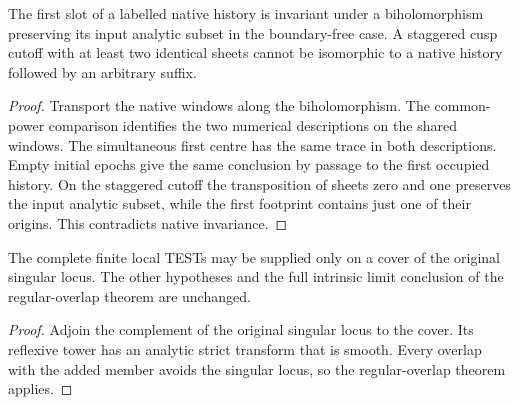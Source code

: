 \begin{proposition}
\label{hir:g8-native-cusp-schedule-symmetry}
\leanok
The first slot of a labelled native history is invariant under
a biholomorphism preserving its input analytic subset in the
boundary-free case. A staggered cusp cutoff with at least two
identical sheets cannot be isomorphic to a native history followed
by an arbitrary suffix.
\end{proposition}
\begin{proof}
Transport the native windows along the biholomorphism. The
common-power comparison identifies the two numerical descriptions
on the shared windows. The simultaneous first centre has the same
trace in both descriptions. Empty initial epochs give the same
conclusion by passage to the first occupied history. On the
staggered cutoff the transposition of sheets zero and one preserves
the input analytic subset, while the first footprint contains just
one of their origins. This contradicts native invariance.
\end{proof}

\begin{corollary}
\label{hir:g8-singular-cover-test-limit}
\leanok
The complete finite local TESTs may be supplied only on a cover of
the original singular locus. The other hypotheses and the full
intrinsic limit conclusion of the regular-overlap theorem are unchanged.
\end{corollary}
\begin{proof}
Adjoin the complement of the original singular locus to the cover.
Its reflexive tower has an analytic strict transform that is smooth.
Every overlap with the added member avoids the singular locus, so the
regular-overlap theorem applies.
\end{proof}


